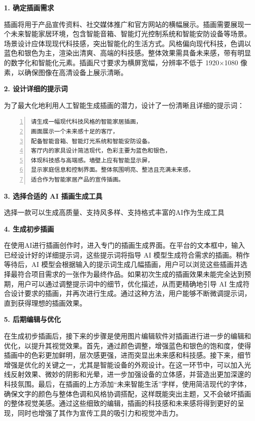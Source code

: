 \textbf{1. 确定插画需求}

插画将用于产品宣传资料、社交媒体推广和官方网站的横幅展示。插画需要展现一个未来智能家居环境，包含智能音箱、智能灯光控制系统和智能安防设备等场景。场景设计应体现现代科技感，突出智能化的生活方式。风格偏向现代科技，色调以蓝色和银色为主，渲染出清爽、高端的科技感。整体效果需具备未来感，带有明显的数字化和智能化元素。插画尺寸要求为横屏宽幅，分辨率不低于 1920$\times$1080 像素，以确保图像在高清设备上展示清晰。

\textbf{2. 设计详细的提示词}

为了最大化地利用人工智能生成插画的潜力，设计了一份清晰且详细的提示词：
\begin{lstlisting}[language={python}, label={}, caption={}, basicstyle=\footnotesize\ttfamily, breaklines=true, numbers=left, frame=single]
请生成一幅现代科技风格的智能家居插画，
画面展示一个未来感十足的客厅，
配备智能音箱、智能灯光系统和智能安防设备。
客厅内的家具设计简洁现代，色彩主要为蓝色和银色，
体现科技感与高端感。墙壁上应有智能显示屏，
显示家庭信息和控制界面。整体氛围明亮、整洁且充满未来感，
适合作为智能家居产品的宣传插画。
\end{lstlisting}

\textbf{3. 选择合适的 AI 插画生成工具}

选择一款可以生成高质量、支持风多样、支持格式丰富的AI作为生成工具

\textbf{4. 生成初步插画}

在使用AI进行插画创作时，进入专门的插画生成界面。在平台的文本框中，输入已经设计好的详细提示词，这些提示词将指导 AI 模型生成符合需求的插画。稍作等待后，AI 模型会根据输入的提示词生成几幅插画，用户可以浏览这些插画并选择最符合项目需求的一张作为最终作品。如果初次生成的插画效果未能完全达到预期，用户可以通过调整提示词中的细节，优化描述，从而更精确地引导 AI 生成符合设计要求的插画，并再次进行生成。通过这种方法，用户能够不断微调提示词，直到获得理想的插画效果。

\textbf{5. 后期编辑与优化}

在生成初步插画后，接下来的步骤是使用图片编辑软件对插画进行进一步的编辑和优化，以提升其视觉效果。首先，通过颜色调整，增强蓝色和银色的饱和度，使得插画中的色彩更加鲜明，层次感更强，进而突显出未来感和科技感。接下来，细节增强是优化的关键之一，尤其是智能设备的外观设计。在这一环节中，可以加入光线反射效果、微妙的阴影和光晕，进一步加强设备的立体感，并营造出更加深邃的科技氛围。最后，在插画的上方添加“未来智能生活”字样，使用简洁现代的字体，确保文字的颜色与整体色调和风格协调搭配，这样既能突出主题，又不会破坏插画的整体视觉美感。通过这些细致的编辑，插画的科技感和未来感将得到更好的呈现，同时也增强了其作为宣传工具的吸引力和视觉冲击力。

